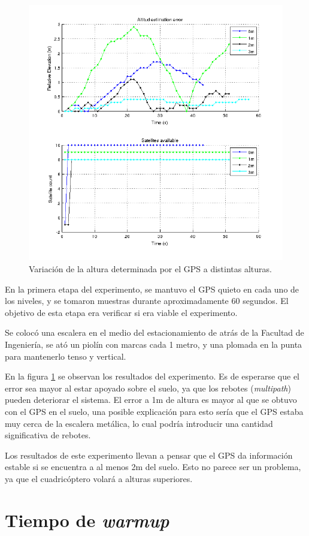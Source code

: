 \documentclass[main]{subfiles}
\begin{document}
\begin{figure}
\vspace{-30pt}
  \begin{center}
  \includegraphics[width=.5\textwidth]{./pics_gps/altura_punto_fijo_fing.png}
  \end{center}
\vspace{-25pt}
  \caption{Variación de la altura determinada por el GPS a distintas alturas.}
  \label{fig:altura_punto_fijo_fing.png}
\vspace{-15pt}
\end{figure}

En la primera etapa del experimento, se mantuvo el GPS quieto en cada uno de los niveles, y se tomaron muestras durante aproximadamente 60 segundos. El objetivo de esta etapa era verificar si era viable el experimento.

Se colocó una escalera en el medio del estacionamiento de atrás de la Facultad de Ingeniería, se ató un piolín con marcas cada 1 metro, y una plomada en la punta para mantenerlo tenso y vertical.

En la figura \ref{fig:altura_punto_fijo_fing.png} se observan los resultados del experimento. Es de esperarse que el error sea mayor al estar apoyado sobre el suelo, ya que los rebotes (\textit{multipath}) pueden deteriorar el sistema. El error a 1m de altura es mayor al que se obtuvo con el GPS en el suelo, una posible explicación para esto sería que el GPS estaba muy cerca de la escalera metálica, lo cual podría introducir una cantidad significativa de rebotes.

Los resultados de este experimento llevan a pensar que el GPS da información estable si se encuentra a al menos 2m del suelo. Esto no parece ser un problema, ya que el cuadricóptero volará a alturas superiores.

\section{Tiempo de \textit{warmup}}
\label{sec:tiempo-de-warmup}
\end{document}
